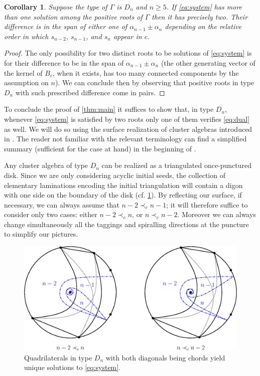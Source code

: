 \documentclass[11pt]{amsart}
\newtheorem{corollary}[theorem]{Corollary}
\theoremstyle{definition}
\numberwithin{equation}{section}
\numberwithin{figure}{section}
\begin{document}
  \begin{corollary}
    \label{cor:kernel-Dn}
    Suppose the type of $\Gamma$ is $D_n$ and $n\geq 5$. 
    If \cref{eq:system} has more than one solution among the positive roots of $\Gamma$ then it has precisely two.
    Their difference is in the span of either one of $\alpha_{n-1}\pm\alpha_n$ depending on the relative order in which $s_{n-2}$, $s_{n-1}$, and $s_n$ appear in $c$.
  \end{corollary}
  \begin{proof}
    The only possibility for two distinct roots to be solutions of \cref{eq:system} is for their difference to be in the span of $\alpha_{n-1}\pm\alpha_n$ (the other generating vector of the kernel of $B_c$, when it exists, has too many connected components by the assumption on $n$). 
    We can conclude then by observing that positive roots in type $D_n$ with such prescribed difference come in pairs.
  \end{proof}

  To conclude the proof of \cref{thm:main} it suffices to show that, in type $D_n$, whenever \cref{eq:system} is satisfied by two roots only one of them verifies \cref{eq:dual} as well.  
  We will do so using the surface realization of cluster algebras introduced in \cite{FST08,FT12}. 
  The reader not familiar with the relevant terminology can find a simplified summary (sufficient for the case at hand) in the beginning of \cite[Section 4.1]{NS14}.
  
  Any cluster algebra of type $D_n$ can be realized as a triangulated once-punctured disk. 
  Since we are only considering acyclic initial seeds, the collection of elementary laminations encoding the initial triangulation will contain a digon with one side on the boundary of the disk (cf. \cref{fig:D_n-roots}).
  By reflecting our surface, if necessary, we can always assume that $n-2 \prec_c n-1$; it will therefore suffice to consider only two cases: either $n-2 \prec_c n$, or $n \prec_c n-2$.
  Moreover we can always change simultaneously all the taggings and spiralling directions at the puncture to simplify our pictures.

  \begin{figure}
    \begin{center}
      \includegraphics[scale=0.7]{D_n-roots.eps}
    \end{center}
    \caption{Quadrilaterals in type $D_n$ with both diagonals being chords yield unique solutions to \cref{eq:system}.}
    \label{fig:D_n-roots}
  \end{figure}
\end{document}
